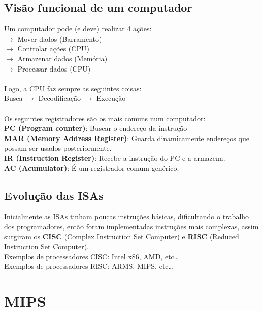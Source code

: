 \documentclass[12pt]{article}
\begin{document}
    \subsection{Visão funcional de um computador}
    Um computador pode (e deve) realizar 4 ações: 
    \\$\rightarrow$ Mover dados (Barramento)
    \\$\rightarrow$ Controlar ações (CPU)
    \\$\rightarrow$ Armazenar dados (Memória)
    \\$\rightarrow$ Processar dados (CPU)
    \\~\\Logo, a CPU faz sempre as seguintes coisas:  
    \\ Busca $\rightarrow$ Decodificação $\rightarrow$ Execução
    \\~\\Os seguintes registradores são os mais comuns num computador:
    \\\textbf{PC (Program counter)}: Buscar o endereço da instrução
    \\\textbf{MAR (Memory Address Register)}: Guarda dinamicamente endereços que possam ser usados posteriormente.
    \\\textbf{IR (Instruction Register)}: Recebe a instrução do PC e a armazena.
    \\\textbf{AC (Acumulator)}: É um registrador comum genérico.

    \subsection{Evolução das ISAs}
    Inicialmente as ISAs tinham poucas instruções básicas, dificultando o trabalho dos programadores, então foram implementadas instruções mais complexas,
    assim surgiram os \textbf{CISC} (Complex Instruction Set Computer) e \textbf{RISC} (Reduced Instruction Set Computer).
    \\Exemplos de processadores CISC: Intel x86, AMD, etc\dots
    \\Exemplos de processadores RISC: ARMS, MIPS, etc\dots

\section{MIPS}
\end{document}
